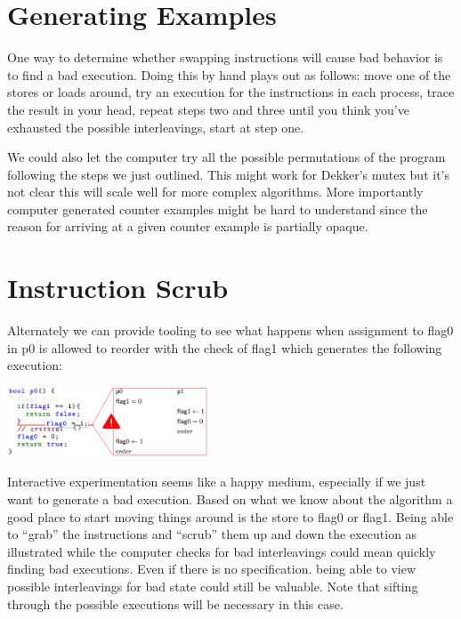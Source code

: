 \documentclass[9pt,twocolumn]{extarticle}
\newcommand{\ttf}[1]{{\ttfamily #1}}
\begin{document}
\section{Generating Examples}
\vspace{-0.25cm}
One way to determine whether swapping instructions will cause bad behavior is to find a bad execution. Doing this by hand plays out as follows: move one of the stores or loads around, try an execution for the instructions in each process, trace the result in your head, repeat steps two and three until you think you've exhausted the possible interleavings, start at step one.

We could also let the computer try all the possible permutations of the program following the steps we just outlined. This might work for Dekker's mutex but it's not clear this will scale well for more complex algorithms. More importantly computer generated counter examples might be hard to understand since the reason for arriving at a given counter example is partially opaque.

\vspace{-0.25cm}
\section{Instruction Scrub}
\vspace{-0.25cm}

Alternately we can provide tooling to see what happens when assignment to \ttf{flag0} in \ttf{p0} is allowed to reorder with the check of \ttf{flag1} which generates the following execution:

\vspace{0.25cm}
\includegraphics[width=0.45\textwidth]{images/scrub.png}
\vspace{0.25cm}

Interactive experimentation seems like a happy medium, especially if we just want to generate a bad execution. Based on what we know about the algorithm a good place to start moving things around is the store to \ttf{flag0} or \ttf{flag1}. Being able to ``grab'' the instructions and ``scrub'' them up and down the execution as illustrated while the computer checks for bad interleavings could mean quickly finding bad executions. Even if there is no specification. being able to view possible interleavings for bad state could still be valuable. Note that sifting through the possible executions will be necessary in this case.
\end{document}
